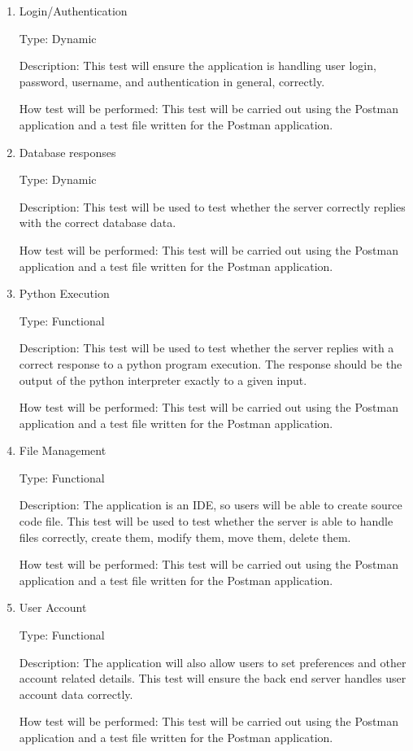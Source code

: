 \documentclass[12pt, titlepage]{article}
\begin{document}
\begin{enumerate}

\item{Login/Authentication\\}

Type: Dynamic
					
Description: This test will ensure the application is handling user login,
password, username, and authentication in general, correctly.

How test will be performed: This test will be carried out using the Postman
application and a test file written for the Postman application.

\item{Database responses\\}

Type: Dynamic
					
Description: This test will be used to test whether the server correctly
replies with the correct database data. 

How test will be performed: This test will be carried out using the Postman
application and a test file written for the Postman application.

\item{Python Execution\\}

Type: Functional
					
Description: This test will be used to test whether the server replies with a 
correct response to a python program execution. The response should be the output
of the python interpreter exactly to a given input.

How test will be performed: This test will be carried out using the Postman
application and a test file written for the Postman application.

\item{File Management\\}

Type: Functional
					
Description: The application is an IDE, so users will be able to create source
code file. This test will be used to test whether the server is able to handle
files correctly, create them, modify them, move them, delete them.

How test will be performed: This test will be carried out using the Postman
application and a test file written for the Postman application.

\item{User Account\\}

Type: Functional
					
Description: The application will also allow users to set preferences and other
account related details. This test will ensure the back end server handles user
account data correctly.

How test will be performed: This test will be carried out using the Postman
application and a test file written for the Postman application.
					
\end{enumerate}
\end{document}
